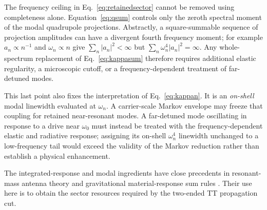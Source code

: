The frequency ceiling in Eq.~\eqref{eq:retainedsector} cannot be removed using completeness alone. Equation~\eqref{eq:qsum} controls only the zeroth spectral moment of the modal quadrupole projections. Abstractly, a square-summable sequence of projection amplitudes can have a divergent fourth frequency moment; for example $a_n\propto n^{-1}$ and $\omega_n\propto n$ give $\sum_n|a_n|^2<\infty$ but $\sum_n\omega_n^4|a_n|^2=\infty$. Any whole-spectrum replacement of Eq.~\eqref{eq:kappasum} therefore requires additional elastic regularity, a microscopic cutoff, or a frequency-dependent treatment of far-detuned modes.

This last point also fixes the interpretation of Eq.~\eqref{eq:kappan}. It is an \emph{on-shell} modal linewidth evaluated at $\omega_n$. A carrier-scale Markov envelope may freeze that coupling for retained near-resonant modes. A far-detuned mode oscillating in response to a drive near $\omega_0$ must instead be treated with the frequency-dependent elastic and radiative response; assigning its on-shell $\omega_n^4$ linewidth unchanged to a low-frequency tail would exceed the validity of the Markov reduction rather than establish a physical enhancement.

The integrated-response and modal ingredients have close precedents in resonant-mass antenna theory and gravitational material-response sum rules \cite{PaikWagoner1976,Aguiar2011,Srivastava2003}. Their use here is to obtain the sector resources required by the two-ended TT propagation cut.

